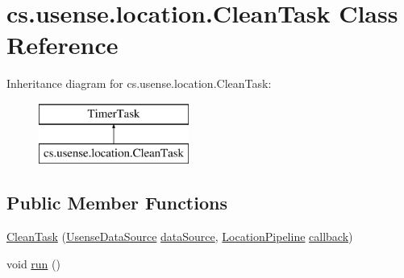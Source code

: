 \hypertarget{classcs_1_1usense_1_1location_1_1_clean_task}{}\section{cs.\+usense.\+location.\+Clean\+Task Class Reference}
\label{classcs_1_1usense_1_1location_1_1_clean_task}
Inheritance diagram for cs.\+usense.\+location.\+Clean\+Task\+:\begin{figure}[H]
\begin{center}
\leavevmode
\includegraphics[height=2.000000cm]{classcs_1_1usense_1_1location_1_1_clean_task}
\end{center}
\end{figure}
\subsection*{Public Member Functions}
\begin{DoxyCompactItemize}
\item 
\hyperlink{classcs_1_1usense_1_1location_1_1_clean_task_a90005f17296054c91da426a984853a4b}{Clean\+Task} (\hyperlink{classcs_1_1usense_1_1db_1_1_usense_data_source}{Usense\+Data\+Source} \hyperlink{classcs_1_1usense_1_1location_1_1_clean_task_a5ef1698db183a017fd359be211bcae32}{data\+Source}, \hyperlink{classcs_1_1usense_1_1location_1_1_location_pipeline}{Location\+Pipeline} \hyperlink{classcs_1_1usense_1_1location_1_1_clean_task_a8b902c430d2b3a4369934283e547bf79}{callback})
\item 
void \hyperlink{classcs_1_1usense_1_1location_1_1_clean_task_aaa42692c23da0fafcd4b39c70140cf3c}{run} ()
\end{DoxyCompactItemize}
